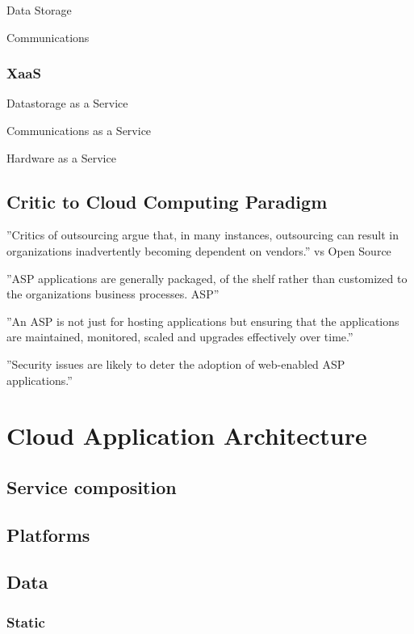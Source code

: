 \documentclass{tktltiki}
\begin{document}
Data Storage

Communications


\subsubsection{XaaS}

Datastorage as a Service

Communications as a Service

Hardware as a Service


\subsection{Critic to Cloud Computing Paradigm}


''Critics of outsourcing argue that, in many instances, outsourcing can result in organizations inadvertently becoming dependent on vendors.'' vs Open Source

''ASP applications are generally packaged, of the shelf rather than customized to the organizations business processes. ASP''

''An ASP is not just for hosting applications but ensuring that the applications are maintained, monitored, scaled and upgrades effectively over time.''

''Security issues are likely to deter the adoption of web-enabled ASP applications.''
\cite{asp}



\section{Cloud Application Architecture}

\subsection{Service composition}

\subsection{Platforms}

\subsection{Data}

\subsubsection{Static}
\end{document}
